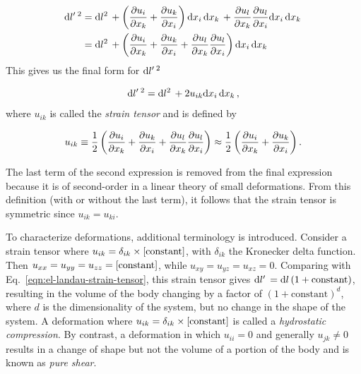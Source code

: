 \begin{align*}
{\text{d}l'}\,^2
    &= {\text{d}l^2}\, + \left( \frac{\partial u_i}{\partial x_k} + \frac{\partial u_k}{\partial x_i}\right) {\text{d}x_i}\, {\text{d}x_k}\, + \frac{\partial u_l}{\partial x_k} \frac{\partial u_l}{\partial x_i}{\text{d}x_i}\,{\text{d}x_k}\, \\
    &= {\text{d}l^2}\, + \left( \frac{\partial u_i}{\partial x_k} + \frac{\partial u_k}{\partial x_i} + \frac{\partial u_l}{\partial x_k} \frac{\partial u_l}{\partial x_i} \right) {\text{d}x_i}\, {\text{d}x_k}\,
\end{align*}
%
This gives us the final form for ${\text{d}l'}\,^2$

\begin{equation}\label{eqn:el-landau-deformed-length}
{\text{d}l'}\,^2 = {\text{d}l^2}\, + 2 u_{ik} {\text{d}x_i}\, {\text{d}x_k}\,,
\end{equation}
%
where $u_{ik}$ is called the \textit{strain tensor} and is defined by

\begin{equation}\label{eqn:el-landau-strain-tensor}
u_{ik} \equiv \frac{1}{2} \left( \frac{\partial u_i}{\partial x_k} + \frac{\partial u_k}{\partial x_i} + \frac{\partial u_l}{\partial x_k} \frac{\partial u_l}{\partial x_i} \right) \approx \frac{1}{2}  \left( \frac{\partial u_i}{\partial x_k} + \frac{\partial u_k}{\partial x_i} \right).
\end{equation}

The last term of the second expression is removed from the final expression because it is of second-order in a linear theory of small deformations.  From this definition (with or without the last term), it follows that the strain tensor is symmetric since $u_{ik} = u_{ki}$.

To characterize deformations, additional terminology is introduced.  Consider a strain tensor where $u_{ik} = \delta_{ik} \times \text{[constant]}$, with $\delta_{ik}$ the Kronecker delta function.  Then $u_{xx} = u_{yy} = u_{zz} = \text{[constant]}$, while $u_{xy} = u_{yz} = u_{xz} = 0$.  Comparing with Eq.~\ref{eqn:el-landau-strain-tensor}, this strain tensor gives ${\text{d}l'}\, = {\text{d}l}\, ( 1 + \text{constant} )$, resulting in the volume of the body changing by a factor of $( 1 + \text{constant} )^d$, where $d$ is the dimensionality of the system, but no change in the shape of the system.  A deformation where $u_{ik} = \delta_{ik} \times \text{[constant]}$ is called a \textit{hydrostatic compression}.  By contrast, a deformation in which $u_{ii} = 0$ and generally $u_{jk} \ne 0$ results in a change of shape but not the volume of a portion of the body and is known as \textit{pure shear}.

